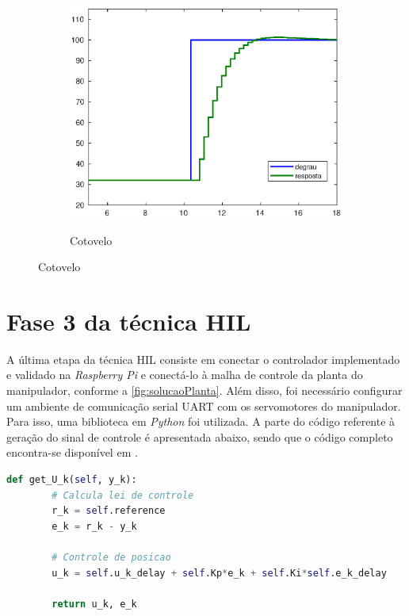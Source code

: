 \begin{figure}[h!]
\begin{subfigure}{.5\textwidth}
    \label{fig:shoulder_hilFase2}
  \end{subfigure}%
  \\[5ex]
  \begin{subfigure}{\textwidth}
    \centering
    \caption{Cotovelo}
    \includegraphics[width = 0.55\columnwidth]{Imagens/forearm_hilFase2}
    \label{fig:forearm_hilFase2}
  \end{subfigure}%
  
  \label{fig:hilFase2} 

\end{figure}

\section{Fase 3 da técnica HIL}

A última etapa da técnica HIL consiste em conectar o controlador implementado e validado 
na \textit{Raspberry Pi} e conectá-lo à malha de controle da planta do
manipulador, conforme a \autoref{fig:solucaoPlanta}. Além disso, foi necessário configurar
um ambiente de comunicação serial UART com os servomotores do manipulador. Para isso, uma
biblioteca em \textit{Python} foi utilizada. A parte do código referente à geração do sinal 
de controle é apresentada abaixo, sendo que o código completo encontra-se disponível 
em \cite{lelis_hil3}.\\[2cm]

\begin{lstlisting}[language=Python]
	def get_U_k(self, y_k):
		# Calcula lei de controle
		r_k = self.reference
		e_k = r_k - y_k
		
		# Controle de posicao
		u_k = self.u_k_delay + self.Kp*e_k + self.Ki*self.e_k_delay
		
		return u_k, e_k
\end{lstlisting}

